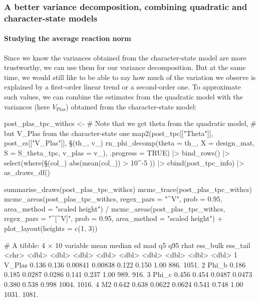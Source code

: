 \documentclass[a4paper,12pt,twoside]{article}
\begin{document}
\subsubsection{A better variance decomposition, combining quadratic and character-state models}

\paragraph{Studying the average reaction norm}
Since we know the variances obtained from the character-state model are more trustworthy, we can use them for our variance decomposition. But at the same time, we would still like to be able to say how much of the variation we observe is explained by a first-order linear trend or a second-order one.
To approximate such values, we can combine the estimates from the quadratic model with the variances (here $V_{\text{Plas}}$) obtained from the character-state model:
\begin{Rinput}
post_plas_tpc_withcs <-
    # Note that we get theta from the quadratic model,
    # but V_Plas from the character-state one
    map2(post_tpc[["Theta"]], post_cs[["V_Plas"]],
         \§§(th_, v_) rn_phi_decomp(theta   = th_,
                                   X      = design_mat,
                                   S      = S_theta_tpc,
                                   v_plas = v_),
         .progress = TRUE) |>
    bind_rows()  |>
    select(where(\§§(col_) { abs(mean(col_)) > 10^-5 })) |>
    cbind(post_tpc_info) |>
    as_draws_df()

summarise_draws(post_plas_tpc_withcs)
mcmc_trace(post_plas_tpc_withcs)
mcmc_areas(post_plas_tpc_withcs,
           regex_pars = "^V",
           prob = 0.95,
           area_method = "scaled height") /
    mcmc_areas(post_plas_tpc_withcs,
               regex_pars = "^[^V]",
               prob = 0.95,
               area_method = "scaled height") +
    plot_layout(heights = c(1, 3))
\end{Rinput}
\begin{Routput}
# A tibble: 4 × 10
  variable  mean median      sd     mad    q5   q95  rhat ess_bulk ess_tail
  <chr>    <dbl>  <dbl>   <dbl>   <dbl> <dbl> <dbl> <dbl>    <dbl>    <dbl>
1 V_Plas   0.136  0.136 0.00841 0.00838 0.122 0.150 1.00      886.    1051.
2 Phi_b    0.186  0.185 0.0287  0.0286  0.141 0.237 1.00      989.     916.
3 Phi_c    0.456  0.454 0.0487  0.0473  0.380 0.538 0.998    1004.    1016.
4 M2       0.642  0.638 0.0622  0.0624  0.541 0.748 1.00     1031.    1081.
\end{Routput}
\end{document}
